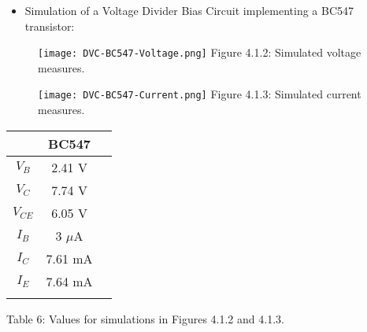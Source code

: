 \pagebreak

{\bfseries\itshape
\begin{itemize}
\item Simulation of a Voltage Divider Bias Circuit implementing a BC547 transistor:
\end{itemize}}

\begin{multicols}{2}
\begin{figure}[H]
\texttt{[image: DVC-BC547-Voltage.png]}
\centering \linebreak \linebreak Figure 4.1.2: Simulated voltage measures.
\end{figure}

\begin{figure}[H]
\texttt{[image: DVC-BC547-Current.png]}
\centering \linebreak \linebreak Figure 4.1.3: Simulated current measures.
\end{figure}
\end{multicols}

\begin{center}
\begin{tabular}[1.5cm]{c c c}
\toprule
\toprule
\centering \hspace{220pt} & \hspace{80pt} {\bfseries BC547} \hspace{80pt} & \\
\midrule
\midrule
$V_{B}$ & 2.41 V \\
\cmidrule{1-3}
$V_{C}$ & 7.74 V \\
\cmidrule{1-3}
$V_{CE}$ & 6.05 V \\
\cmidrule{1-3}
$I_{B}$ & 3 $\mu$A \\
\cmidrule{1-3}
$I_{C}$ & 7.61 mA \\
\cmidrule{1-3}
$I_{E}$ & 7.64 mA \\
\bottomrule
\linebreak
\end{tabular}
\linebreak Table 6: Values for simulations in Figures 4.1.2 and 4.1.3.
\end{center}

\pagebreak